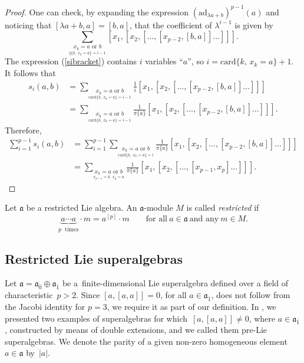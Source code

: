 \documentclass[10pt,a4paper]{amsart}
\numberwithin{equation}{section}
\begin{document}
\begin{proof}
 One can check, by expanding the expression $(\mathrm{ad}_{\lambda a+b})^{p-1}(a)$ and noticing that $[\lambda a+b,a]=[b,a]$, that the coefficient of $\lambda^{i-1}$ is given by
 \begin{equation}
 \label{sibracket}
 \sum_{\underset{\sharp\{k,~x_k=a\}=i-1}{x_k=a \text{ or } b}}[x_1,[x_2,[\dots ,[x_{p-2},[b,a]]\dots ]]].
 \end{equation}
The expression (\ref{sibracket}) contains $i$ variables ``$a$'', so $i=\mathrm{card}\{k,\,x_k=a\}+1. $
It follows that
\begin{align*}
 s_i(a,b)&=\sum_{\underset{\text{card}\{k,~x_k=a\}=i-1}{x_k=a \text{ or } b}}\frac{1}{i}[x_1,[x_2,[\dots ,[x_{p-2},[b,a]]\dots ]]]\\[-1mm]
 &=\sum_{\underset{\text{card}\{k,~x_k=a\}=i-1}{x_k=a \text{ or } b}}\frac{1}{\pi\{a\}}[x_1,[x_2,[\dots ,[x_{p-2},[b,a]]\dots ]]].
\end{align*}
Therefore,
\begin{align*}
 \sum_{i=1}^{p-1}s_i(a,b)&=\sum_{i=1}^{p-1}\sum_{\underset{\text{card}\{k,~x_k=a\}=i}{x_k=a \text{ or } b}}\frac{1}{\pi\{a\}}[x_1,[x_2,[\dots ,[x_{p-2},[b,a]]\dots ]]]\\[-1mm]
 &=\sum_{\underset{x_{p-1}=b,~x_p=a}{x_k=a \text{ or } b}}\frac{1}{\pi\{a\}}[x_1,[x_2,[\dots ,[x_{p-1},x_p]\dots ]]]. \tag*{\qed}
\end{align*}
\renewcommand{\qed}{}
\end{proof}
Let $\mathfrak{a}$ be a restricted Lie algebra. An $\mathfrak{a}$-module $M$ is called \textit{restricted} if
\[
\underbrace{a\cdots a}_{p\text{~~times}}\cdot m =a^{[p]}\cdot m \qquad \text{for all}\ a\in \mathfrak{a} \ \text{and any} \ m\in M.
\]
\subsection{Restricted Lie superalgebras}
Let $\mathfrak{a}=\mathfrak{a}_{\bar 0}\oplus \mathfrak{a}_{\bar 1} $ be a~finite-dimensional Lie superalgebra defined over a field of characteristic~$p>2$. Since $[a,[a,a]]=0$, for all $a\in \mathfrak{a}_{\bar 1}$, does not follow from the Jacobi identity for $p=3$, we require it as part of our definition. In \cite{BBH}, we presented two examples of superalgebras for which~$[a,[a,a]]\not=0$, where $a\in \mathfrak{a}_{\bar 1}$, constructed by means of double extensions, and we called them pre-Lie superalgebras. We denote the parity of a given non-zero homogeneous element~$a\in\mathfrak{a}$ by~$|a|$.
\end{document}
